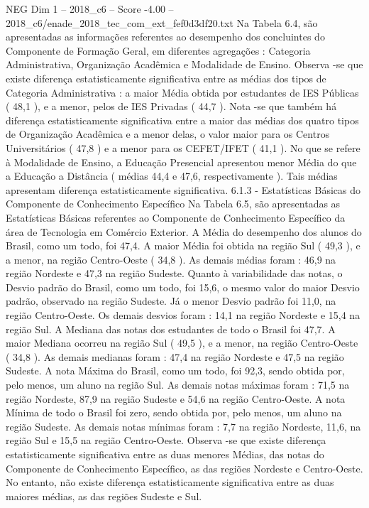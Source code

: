 \begin{textsample}{NEG Dim 1 – 2018\_c6 – Score -4.00 – 2018\_c6/enade\_2018\_tec\_com\_ext\_fef0d3df20.txt}
Na Tabela 6.4, são apresentadas as informações referentes ao desempenho dos concluintes do Componente de Formação Geral, em diferentes agregações : Categoria Administrativa, Organização Acadêmica e Modalidade de Ensino.
Observa -se que existe diferença estatisticamente significativa entre as médias dos tipos de Categoria Administrativa : a maior Média obtida por estudantes de IES Públicas ( 48,1 ), e a menor, pelos de IES Privadas ( 44,7 ).
Nota -se que também há diferença estatisticamente significativa entre a maior das médias dos quatro tipos de Organização Acadêmica e a menor delas, o valor maior para os Centros Universitários ( 47,8 ) e a menor para os CEFET/IFET ( 41,1 ).
No que se refere à Modalidade de Ensino, a Educação Presencial apresentou menor Média do que a Educação a Distância ( médias 44,4 e 47,6, respectivamente ).
Tais médias apresentam diferença estatisticamente significativa. 6.1.3 - Estatísticas Básicas do Componente de Conhecimento Específico Na Tabela 6.5, são apresentadas as Estatísticas Básicas referentes ao Componente de Conhecimento Específico da área de Tecnologia em Comércio Exterior.
A Média do desempenho dos alunos do Brasil, como um todo, foi 47,4.
A maior Média foi obtida na região Sul ( 49,3 ), e a menor, na região Centro-Oeste ( 34,8 ).
As demais médias foram : 46,9 na região Nordeste e 47,3 na região Sudeste.
Quanto à variabilidade das notas, o Desvio padrão do Brasil, como um todo, foi 15,6, o mesmo valor do maior Desvio padrão, observado na região Sudeste.
Já o menor Desvio padrão foi 11,0, na região Centro-Oeste.
Os demais desvios foram : 14,1 na região Nordeste e 15,4 na região Sul.
A Mediana das notas dos estudantes de todo o Brasil foi 47,7.
A maior Mediana ocorreu na região Sul ( 49,5 ), e a menor, na região Centro-Oeste ( 34,8 ).
As demais medianas foram : 47,4 na região Nordeste e 47,5 na região Sudeste.
A nota Máxima do Brasil, como um todo, foi 92,3, sendo obtida por, pelo menos, um aluno na região Sul.
As demais notas máximas foram : 71,5 na região Nordeste, 87,9 na região Sudeste e 54,6 na região Centro-Oeste.
A nota Mínima de todo o Brasil foi zero, sendo obtida por, pelo menos, um aluno na região Sudeste.
As demais notas mínimas foram : 7,7 na região Nordeste, 11,6, na região Sul e 15,5 na região Centro-Oeste.
Observa -se que existe diferença estatisticamente significativa entre as duas menores Médias, das notas do Componente de Conhecimento Específico, as das regiões Nordeste e Centro-Oeste.
No entanto, não existe diferença estatisticamente significativa entre as duas maiores médias, as das regiões Sudeste e Sul.

\end{textsample}
